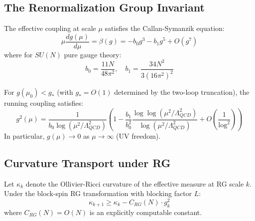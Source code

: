 \subsection{The Renormalization Group Invariant}

\begin{definition}
The effective coupling at scale $\mu$ satisfies the Callan-Symanzik equation:
\begin{equation}
    \mu \frac{d g(\mu)}{d\mu} = \beta(g) = -b_0 g^3 - b_1 g^5 + O(g^7)
\end{equation}
where for $SU(N)$ pure gauge theory:
\begin{equation}
    b_0 = \frac{11 N}{48\pi^2}, \quad b_1 = \frac{34 N^2}{3(16\pi^2)^2}
\end{equation}
\end{definition}

\begin{theorem}\label{thm:asymptotic_freedom_app}
For $g(\mu_0) < g_*$ (with $g_* = O(1)$ determined by the two-loop truncation), the running coupling satisfies:
\begin{equation}
    g^2(\mu) = \frac{1}{b_0 \log(\mu^2/\Lambda_{QCD}^2)} \left(1 - \frac{b_1}{b_0^2} \frac{\log\log(\mu^2/\Lambda_{QCD}^2)}{\log(\mu^2/\Lambda_{QCD}^2)} + O\left(\frac{1}{\log^2}\right)\right)
\end{equation}
In particular, $g(\mu) \to 0$ as $\mu \to \infty$ (UV freedom).
\end{theorem}

\subsection{Curvature Transport under RG}

\begin{theorem}\label{thm:curvature_monotonicity}
Let $\kappa_k$ denote the Ollivier-Ricci curvature of the effective measure at RG scale $k$. Under the block-spin RG transformation with blocking factor $L$:
\begin{equation}
    \kappa_{k+1} \geq \kappa_k - C_{RG}(N) \cdot g_k^2
\end{equation}
where $C_{RG}(N) = O(N)$ is an explicitly computable constant.
\end{theorem}

